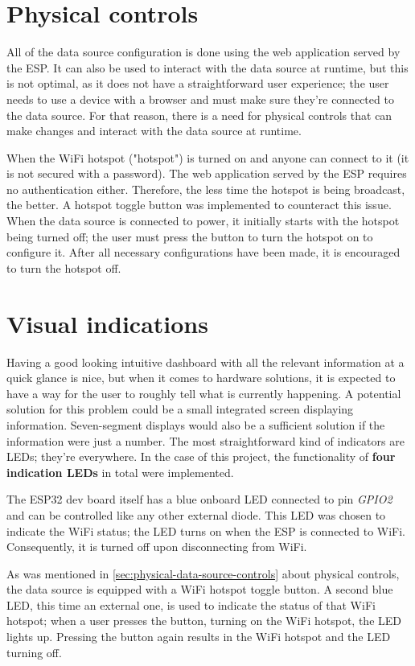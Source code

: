 \documentclass[FM,BP,EN,fonts]{tulthesis}
\begin{document}
\newpage

\section{Physical controls}
\label{sec:physical-data-source-controls}
All of the data source configuration is done using the web application served by the ESP. It can also be used to interact with the data source at runtime, but this is not optimal, as it does not have a straightforward user experience; the user needs to use a device with a browser and must make sure they're connected to the data source. For that reason, there is a need for physical controls that can make changes and interact with the data source at runtime.

When the WiFi hotspot ("hotspot") is turned on and anyone can connect to it (it is not secured with a password). The web application served by the ESP requires no authentication either. Therefore, the less time the hotspot is being broadcast, the better. A hotspot toggle button was implemented to counteract this issue. When the data source is connected to power, it initially starts with the hotspot being turned off; the user must press the button to turn the hotspot on to configure it. After all necessary configurations have been made, it is encouraged to turn the hotspot off.

\section{Visual indications}
Having a good looking intuitive dashboard with all the relevant information at a quick glance is nice, but when it comes to hardware solutions, it is expected to have a way for the user to roughly tell what is currently happening. A potential solution for this problem could be a small integrated screen displaying information. Seven-segment displays would also be a sufficient solution if the information were just a number. The most straightforward kind of indicators are LEDs; they're everywhere. In the case of this project, the functionality of \textbf{four indication LEDs} in total were implemented. 

The ESP32 dev board itself has a blue onboard LED connected to pin \textit{GPIO2} and can be controlled like any other external diode. This LED was chosen to indicate the WiFi status; the LED turns on when the ESP is connected to WiFi. Consequently, it is turned off upon disconnecting from WiFi. 

As was mentioned in \autoref{sec:physical-data-source-controls} about physical controls, the data source is equipped with a WiFi hotspot toggle button. A second blue LED, this time an external one, is used to indicate the status of that WiFi hotspot; when a user presses the button, turning on the WiFi hotspot, the LED lights up. Pressing the button again results in the WiFi hotspot and the LED turning off.
\end{document}
